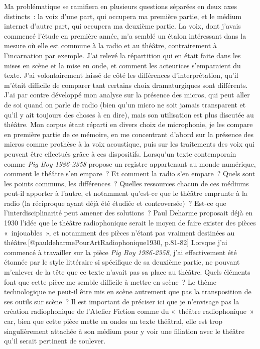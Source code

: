 \documentclass[
]{article}
\begin{document}
Ma problématique se ramifiera en plusieurs questions séparées en deux axes distincts~: la voix d'une part, qui occupera ma première partie, et le médium internet d'autre part, qui occupera ma deuxième partie. La voix, dont j'avais commencé l'étude en première année, m'a semblé un étalon intéressant dans la mesure où elle est commune à la radio et au théâtre, contrairement à l'incarnation par exemple. J'ai relevé la répartition qui en était faite dans les mises en scène et la mise en onde, et comment les acteurices s'emparaient du texte. J'ai volontairement laissé de côté les différences d'interprétation, qu'il m'était difficile de comparer tant certains choix dramaturgiques sont différents. J'ai par contre développé mon analyse sur la présence des micros, qui peut aller de soi quand on parle de radio (bien qu'un micro ne soit jamais transparent et qu'il y ait toujours des choses à en dire), mais son utilisation est plus discutée au théâtre. Mon corpus étant réparti en divers choix de microphonie, je les compare en première partie de ce mémoire, en me concentrant d'abord sur la présence des micros comme prothèse à la voix acoustique, puis sur les traitements des voix qui peuvent être effectués grâce à ces dispositifs. Lorsqu'un texte contemporain comme \emph{Pig Boy 1986-2358} propose un registre appartenant au monde numérique, comment le théâtre s'en empare~? Et comment la radio s'en empare~? Quels sont les points communs, les différences~? Quelles ressources chacun de ces médiums peut-il apporter à l'autre, et notamment qu'est-ce que le théâtre emprunte à la radio (la réciproque ayant déjà été étudiée et controversée)~? Est-ce que l'interdisciplinarité peut amener des solutions~? Paul Deharme proposait déjà en 1930 l'idée que le théâtre radiophonique serait le moyen de faire exister des pièces «~injouables~», et notamment des pièces n'étant pas vraiment destinées au théâtre.{[}@pauldeharmePourArtRadiophonique1930, p.81-82{]} Lorsque j'ai commencé à travailler sur la pièce \emph{Pig Boy 1986-2358}, j'ai effectivement été étonnée par le style littéraire si spécifique de sa deuxième partie, ne pouvant m'enlever de la tête que ce texte n'avait pas sa place au théâtre. Quels éléments font que cette pièce me semble difficile à mettre en scène~? Le thème technologique ne peut-il être mis en scène autrement que pas la transposition de ses outils sur scène~? Il est important de préciser ici que je n'envisage pas la création radiophonique de l'Atelier Fiction comme du «~théâtre radiophonique~» car, bien que cette pièce mette en ondes un texte théâtral, elle est trop singulièrement attachée à son médium pour y voir une filiation avec le théâtre qu'il serait pertinent de soulever.
\end{document}
